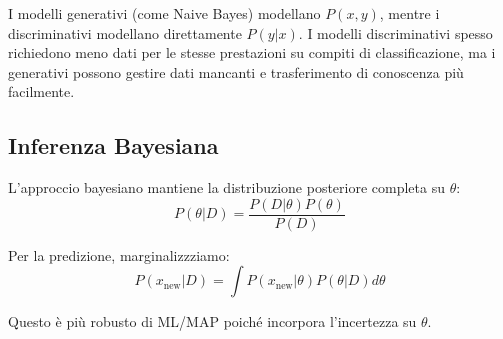 I modelli generativi (come Naive Bayes) modellano $P(x,y)$, mentre i discriminativi modellano direttamente $P(y|x)$. I modelli discriminativi spesso richiedono meno dati per le stesse prestazioni su compiti di classificazione, ma i generativi possono gestire dati mancanti e trasferimento di conoscenza più facilmente.

\subsection{Inferenza Bayesiana}

L'approccio bayesiano mantiene la distribuzione posteriore completa su $\theta$:
\[P(\theta|D) = \frac{P(D|\theta)P(\theta)}{P(D)}\]

Per la predizione, marginalizzziamo:
\[P(x_{\text{new}}|D) = \int P(x_{\text{new}}|\theta)P(\theta|D) d\theta\]

Questo è più robusto di ML/MAP poiché incorpora l'incertezza su $\theta$.

